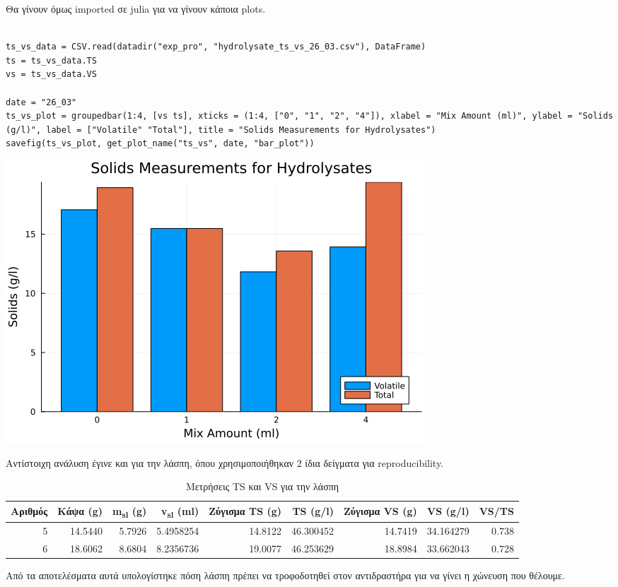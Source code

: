 \documentclass[11pt]{article}
\begin{document}
Θα γίνουν όμως imported σε julia για να γίνουν κάποια plots.

\begin{verbatim}

ts_vs_data = CSV.read(datadir("exp_pro", "hydrolysate_ts_vs_26_03.csv"), DataFrame)
ts = ts_vs_data.TS
vs = ts_vs_data.VS

date = "26_03"
ts_vs_plot = groupedbar(1:4, [vs ts], xticks = (1:4, ["0", "1", "2", "4"]), xlabel = "Mix Amount (ml)", ylabel = "Solids (g/l)", label = ["Volatile" "Total"], title = "Solids Measurements for Hydrolysates")
savefig(ts_vs_plot, get_plot_name("ts_vs", date, "bar_plot"))
\end{verbatim}

\begin{center}
\includegraphics[width=.9\linewidth]{../plots/26_03/ts_vs_bar_plot_26_03.png}
\end{center}

Αντίστοιχη ανάλυση έγινε και για την λάσπη, όπου χρησιμοποιήθηκαν 2 ίδια δείγματα για reproducibility.

\begin{table}[htbp]
\caption{Μετρήσεις TS και VS για την λάσπη}
\centering
\begin{tabular}{rrrrrrrrr}
Αριθμός & Κάψα (g) & m\textsubscript{sl} (g) & v\textsubscript{sl} (ml) & Ζύγισμα TS (g) & TS (g/l) & Ζύγισμα VS (g) & VS (g/l) & VS/TS\\[0pt]
\hline
5 & 14.5440 & 5.7926 & 5.4958254 & 14.8122 & 46.300452 & 14.7419 & 34.164279 & 0.738\\[0pt]
6 & 18.6062 & 8.6804 & 8.2356736 & 19.0077 & 46.253629 & 18.8984 & 33.662043 & 0.728\\[0pt]
\end{tabular}
\end{table}

Από τα αποτελέσματα αυτά υπολογίστηκε πόση λάσπη πρέπει να τροφοδοτηθεί στον αντιδραστήρα για να γίνει η χώνευση που θέλουμε.
\end{document}
